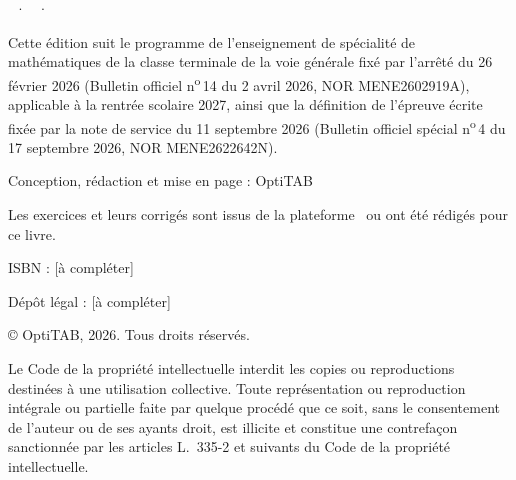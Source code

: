 \thispagestyle{empty}
\vspace*{\fill}
\begin{minipage}{120mm}
\fontsize{8.5}{11.5}\selectfont\color{otMuted}
{\otSemi\fontsize{8.5}{11}\selectfont\color{otInk}\otTitreLivre\ · \otNiveau\ · \otSousTitre}\par
{\otMedium\fontsize{8.5}{11}\selectfont\color{otInk}\otEdition}\par
\vspace{2mm}
Cette édition suit le programme de l'enseignement de spécialité de mathématiques de la classe terminale de la voie générale
fixé par l'arrêté du 26 février 2026 (Bulletin officiel n\textsuperscript{o}\,14 du 2 avril 2026, NOR MENE2602919A),
applicable à la rentrée scolaire 2027, ainsi que la définition de l'épreuve écrite fixée par la note de service du
11 septembre 2026 (Bulletin officiel spécial n\textsuperscript{o}\,4 du 17 septembre 2026, NOR MENE2622642N).\par
\vspace{2mm}
Conception, rédaction et mise en page : OptiTAB\par
Les exercices et leurs corrigés sont issus de la plateforme \otSite\ ou ont été rédigés pour ce livre.\par
\vspace{4mm}
ISBN : [à compléter]\par
Dépôt légal : [à compléter]\par
\vspace{4mm}
© OptiTAB, 2026. Tous droits réservés.\par
\vspace{4mm}
Le Code de la propriété intellectuelle interdit les copies ou reproductions
destinées à une utilisation collective. Toute représentation ou reproduction
intégrale ou partielle faite par quelque procédé que ce soit, sans le
consentement de l'auteur ou de ses ayants droit, est illicite et constitue une
contrefaçon sanctionnée par les articles L.~335-2 et suivants du Code de la
propriété intellectuelle.\par
\end{minipage}
\clearpage
